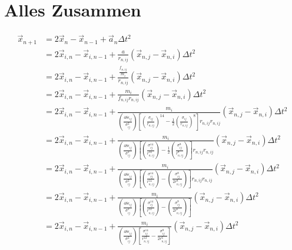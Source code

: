 \documentclass{article}
\begin{document}
\section*{Alles Zusammen}
\begin{align*}
	\vec{x}_{n+1}&=2\vec{x}_n-\vec{x}_{n-1}+\vec{a}_n\Delta t^2\\
	&=2\vec{x}_{i,n}-\vec{x}_{i,n-1}+\frac{a}{r_{n,ij}}\left(\vec{x}_{n,j}-\vec{x}_{n,i}\right)\Delta t^2\\
	&=2\vec{x}_{i,n}-\vec{x}_{i,n-1}+\frac{\frac{f_{n,ij}}{m_i}}{r_{n,ij}}\left(\vec{x}_{n,j}-\vec{x}_{n,i}\right)\Delta t^2\\	
	&=2\vec{x}_{i,n}-\vec{x}_{i,n-1}+\frac{m_i}{f_{n,ij}r_{n,ij}}\left(\vec{x}_{n,j}-\vec{x}_{n,i}\right)\Delta t^2\\	
	&=2\vec{x}_{i,n}-\vec{x}_{i,n-1}+\frac{m_i}{\left(\frac{48\epsilon_{ij}}{\sigma_{ij}^2}\right)\left[\left(\frac{\sigma_{ij}}{r_{n,ij}}\right)^{14}-\frac{1}{2}\left(\frac{\sigma_{ij}}{r_{n,ij}}\right)^8\right]r_{n,ij}r_{n,ij}}\left(\vec{x}_{n,j}-\vec{x}_{n,i}\right)\Delta t^2\\	
	&=2\vec{x}_{i,n}-\vec{x}_{i,n-1}+\frac{m_i}{\left(\frac{48\epsilon_{ij}}{\sigma_{ij}^2}\right)\left[\left(\frac{\sigma_{ij}^{14}}{r_{n,ij}^{14}}\right)-\frac{1}{2}\left(\frac{\sigma_{ij}^8}{r_{n,ij}^8}\right)\right]r_{n,ij}r_{n,ij}}\left(\vec{x}_{n,j}-\vec{x}_{n,i}\right)\Delta t^2\\	
	&=2\vec{x}_{i,n}-\vec{x}_{i,n-1}+\frac{m_i}{\left(\frac{48\epsilon_{ij}}{\sigma_{ij}^2}\right)\left[\left(\frac{\sigma_{ij}^{14}}{r_{n,ij}^{14}}\right)-\left(\frac{\sigma_{ij}^8}{2r_{n,ij}^8}\right)\right]r_{n,ij}r_{n,ij}}\left(\vec{x}_{n,j}-\vec{x}_{n,i}\right)\Delta t^2\\	
	&=2\vec{x}_{i,n}-\vec{x}_{i,n-1}+\frac{m_i}{\left(\frac{48\epsilon_{ij}}{\sigma_{ij}^2}\right)\left[\left(\frac{\sigma_{ij}^{14}}{r_{n,ij}^{12}}\right)-\left(\frac{\sigma_{ij}^8}{2r_{n,ij}^6}\right)\right]}\left(\vec{x}_{n,j}-\vec{x}_{n,i}\right)\Delta t^2\\	
	&=2\vec{x}_{i,n}-\vec{x}_{i,n-1}+\frac{m_i}{\left(\frac{48\epsilon_{ij}}{\sigma_{ij}^2}\right)\left[\frac{\sigma_{ij}^{14}}{r_{n,ij}^{12}}-\frac{\sigma_{ij}^8}{2r_{n,ij}^6}\right]}\left(\vec{x}_{n,j}-\vec{x}_{n,i}\right)\Delta t^2\\	
\end{align*}
\end{document}
